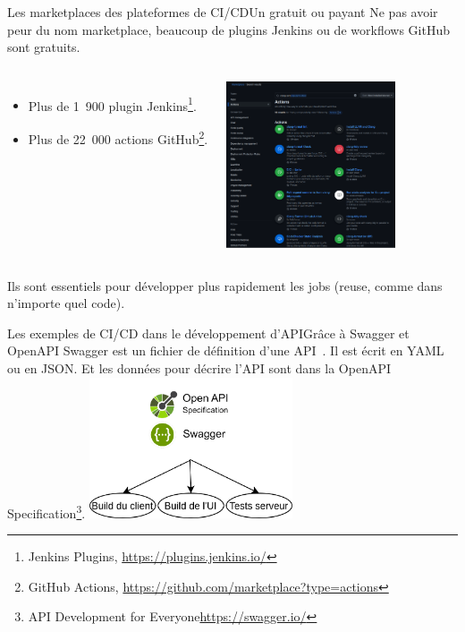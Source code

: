 \documentclass{beamer}
\begin{document}
    \begin{frame}{Les marketplaces des plateformes de CI/CD}{Un  gratuit ou payant}
        \transdissolve
        Ne pas avoir peur du nom marketplace, beaucoup de plugins Jenkins ou de workflows GitHub sont gratuits.
        \begin{columns}
            \begin{itemize}
                \item Plus de 1~900 plugin Jenkins\footnote[frame]{Jenkins Plugins, \url{https://plugins.jenkins.io/}}.
                \item Plus de 22~000 actions GitHub\footnote[frame]{GitHub Actions, \url{https://github.com/marketplace?type=actions}}.
            \end{itemize}
            \centering
            \includegraphics[width=5cm]{image/github-marketplace}
        \end{columns}
        Ils sont essentiels pour développer plus rapidement les jobs (reuse, comme dans n'importe quel code).
    \end{frame}

    \begin{frame}{Les exemples de CI/CD dans le développement d'API}{Grâce à Swagger et OpenAPI}
        \transdissolve
        Swagger est un fichier de définition d'une API~.
        Il est écrit en YAML ou en JSON. Et les données pour décrire l'API sont dans la OpenAPI Specification\footnote{API Development for Everyone\url{https://swagger.io/}}.
        \break
        \centering
        \includegraphics[width=6cm]{image/swagger-capacity.drawio}
    \end{frame}
\end{document}
